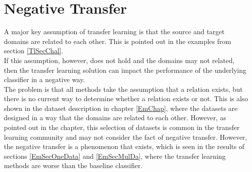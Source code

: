 \section{Negative Transfer}\label{TlSecNeg}
A major key assumption of transfer learning is that the source and target domains are related to each other.
This is pointed out in the examples from section \ref{TlSecChal}.\\
If this assumption, however, does not hold and the domains may not related, then the transfer learning solution can impact the performance of the underlying classifier in a negative way.\cite[p. 29]{Weiss.2016}\\
The problem is that all methods take the assumption that a relation exists, but there is no current way to determine whether a relation exists or not.\cite[p. 1672]{Taylor.2009}
This is also shown in the dataset description in chapter \ref{EmChap}, where the datasets are designed in a way that the domains are related to each other.
However, as pointed out in the chapter, this selection of datasets is common in the transfer learning community and may not consider the fact of negative transfer.
However, the negative transfer is a phenomenon that exists, which is seen in the results of sections \ref{EmSecOneData} and \ref{EmSecMulDa}, where the transfer learning methods are worse than the baseline classifier.

